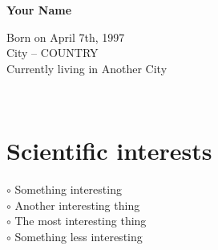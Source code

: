 \documentclass[a4paper,10pt]{article}
\begin{document}
\thispagestyle{empty}

\begin{adjustbox}{valign=t}
\begin{minipage}{0.3\textwidth} %
\begin{center}

\MySkip 	%

{\LARGE \bfseries Your Name}

\MySkip 	%

Born on April 7th, 1997\\
City -- COUNTRY\\
Currently living in Another City\\

\MySkip 	%

\textcolor{ColorTwo}{\faEnvelopeO} 
 \\

\textcolor{ColorTwo}{\faChain} 
\end{center}

\vfill

\section*{Scientific interests}
\raggedright
\textcolor{ColorOne}{$\circ$} Something interesting\\
\textcolor{ColorOne}{$\circ$} Another interesting thing\\
\textcolor{ColorOne}{$\circ$} The most interesting thing\\
\textcolor{ColorOne}{$\circ$} Something less interesting


\end{minipage}
\end{adjustbox}
\end{document}
